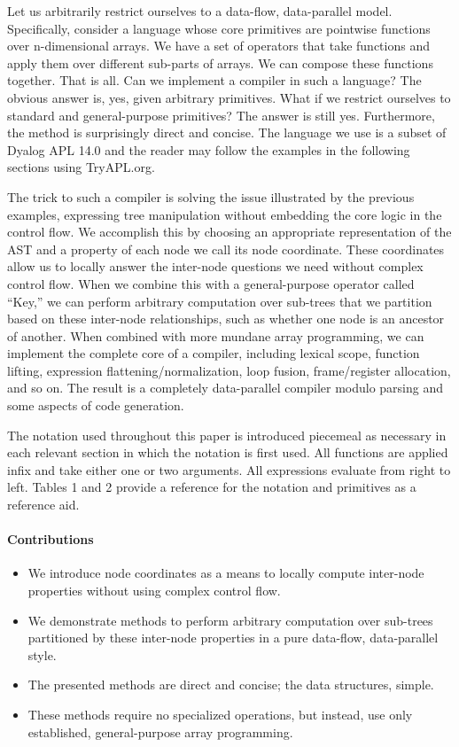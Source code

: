 \documentclass[pldi]{sigplanconf-pldi15}
\begin{document}
Let us arbitrarily restrict ourselves to a data-flow, data-parallel model. Specifically, consider a language 
whose core primitives are pointwise functions over n-dimensional arrays. We have a set of operators that 
take functions and apply them over different sub-parts of arrays. We can compose these functions together. 
That is all. Can we implement a compiler in such a language? The obvious answer is, yes, given arbitrary 
primitives. What if we restrict ourselves to standard and general-purpose primitives? The answer is still 
yes. Furthermore, the method is surprisingly direct and concise. The language we use is a subset of Dyalog 
APL 14.0 and the reader may follow the examples in the following sections using TryAPL.org. 

The trick to such a compiler is solving the issue illustrated by the previous examples, expressing tree 
manipulation without embedding the core logic in the control flow. We accomplish this by choosing an 
appropriate representation of the AST and a property of each node we call its node coordinate. These 
coordinates allow us to locally answer the inter-node questions we need without complex control flow. When 
we combine this with a general-purpose operator called “Key,” we can perform arbitrary computation over 
sub-trees that we partition based on these inter-node relationships, such as whether one node is an ancestor 
of another. When combined with more mundane array programming, we can implement the complete core of a 
compiler, including lexical scope, function lifting, expression flattening/normalization, loop fusion, 
frame/register allocation, and so on. The result is a completely data-parallel compiler modulo parsing and 
some aspects of code generation.

The notation used throughout this paper is introduced piecemeal as necessary in each relevant section in 
which the notation is first used. All functions are applied infix and take either one or two arguments. All 
expressions evaluate from right to left. Tables 1 and 2 provide a reference for the notation and primitives 
as a reference aid.

\paragraph{Contributions}

\begin{itemize}[noitemsep]
\item We introduce node coordinates as a means to locally compute inter-node properties without using complex 
control flow.
\item We demonstrate methods to perform arbitrary computation over sub-trees partitioned by these 
inter-node properties in a pure data-flow, data-parallel style.
\item The presented methods are direct and concise; the data structures, simple.
\item These methods require no specialized operations, but instead, use only established, general-purpose 
array programming.
\end{itemize}


\end{document}
